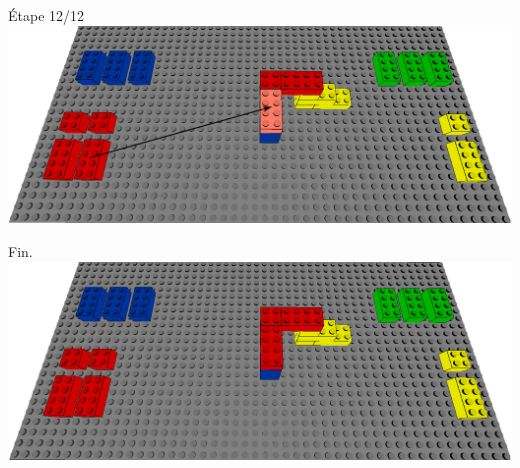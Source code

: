 \documentclass[aspectratio=169]{beamer}
\begin{document}
\begin{frame}
    Étape 12/12
    \vfill
  \includegraphics[width=\linewidth]{step12.png}
\end{frame}

\begin{frame}
    Fin.
    \vfill
  \includegraphics[width=\linewidth]{end.png}
\end{frame}
\end{document}
